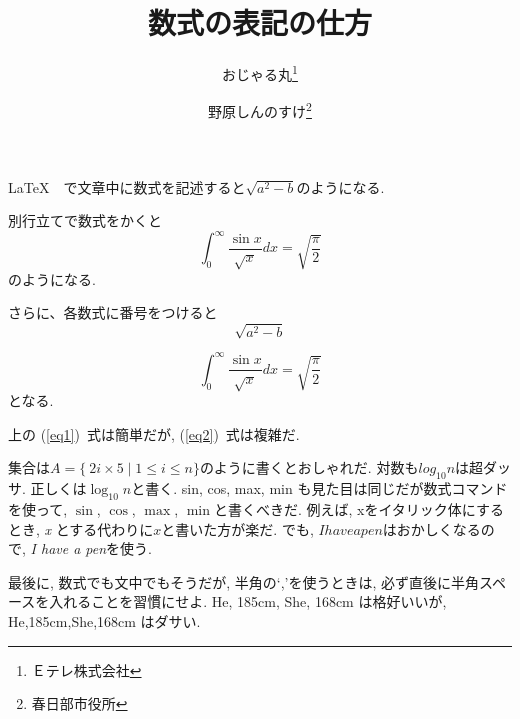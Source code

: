 \documentclass[a4j]{jarticle}
\begin{document}
\title{数式の表記の仕方}
\author{おじゃる丸\thanks{Ｅテレ株式会社} \and 野原しんのすけ\thanks{春日部市役所}}
\date{}

\maketitle

\LaTeX　で文章中に数式を記述すると$\sqrt{a^2-b}$のようになる.

別行立てで数式をかくと\[\int_0^\infty\frac{\sin x}{\sqrt{x}}dx = \sqrt{\frac{\pi}{2}}\]のようになる.

さらに、各数式に番号をつけると
\begin{equation} \label{eq1}
  \sqrt{a^2-b}
\end{equation}

\begin{equation} \label{eq2}
  \int_0^\infty\frac{\sin x}{\sqrt{x}}dx = \sqrt{\frac{\pi}{2}}
\end{equation}
となる.

上の (\ref{eq1})~式は簡単だが, (\ref{eq2})~式は複雑だ.

\vspace{2zh}

集合は$A=\{\ 2i \times 5 \mid 1 \le i \leq n\}$のように書くとおしゃれだ.
対数も$log_{10} n$は超ダッサ. 正しくは$\log_{10} n$と書く.
sin, cos, max, min も見た目は同じだが数式コマンドを使って, $\sin$, $\cos$, $\max$, $\min$と書くべきだ.
例えば, xをイタリック体にするとき, \textit{x} とする代わりに$x$と書いた方が楽だ. でも, $I have a pen$はおかしくなるので, \textit{I have a pen}を使う.

最後に, 数式でも文中でもそうだが, 半角の`,'を使うときは, 必ず直後に半角スペースを入れることを習慣にせよ.
He, 185cm, She, 168cm は格好いいが, He,185cm,She,168cm はダサい.
\end{document}

